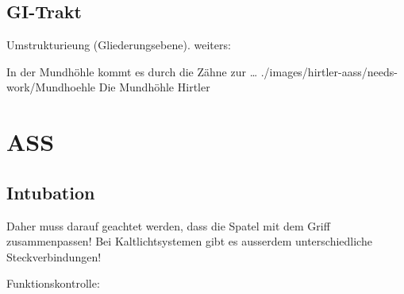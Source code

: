 \documentclass[
ngerman,
paper=a4,
asymmetric,
fontsize=10pt,
draft=false,
numbers=noenddot,
bibtotocnumbered,
footnotes=multiple,
]{scrreprt}
\newcommand{\jNEU}{\vspace{6pt}\noindent{\color{green}\sffamily\textbf{ADDED}\hrulefill\newline}}
\newcommand{\jNEUende}{\newline{\color{green}\rule{\linewidth}{3pt}\newline}}
\begin{document}
\subsection{GI-Trakt}

Umstrukturieung (Gliederungsebene). weiters:

{%
In der Mundhöhle kommt es durch die Zähne zur
\ldots
}
{}
{./images/hirtler-aass/needs-work/Mundhoehle}
{Die Mundhöhle}
{Hirtler}


\section{ASS}
\subsection{Intubation}

\jNEU
     \Ca{{\SymbolGefahren}} Daher muss
    darauf geachtet werden, dass die Spatel mit dem Griff
    zusammenpassen! Bei Kaltlichtsystemen gibt es ausserdem
    unterschiedliche Steckverbindungen!
\jNEUende

Funktionskontrolle:
\end{document}
